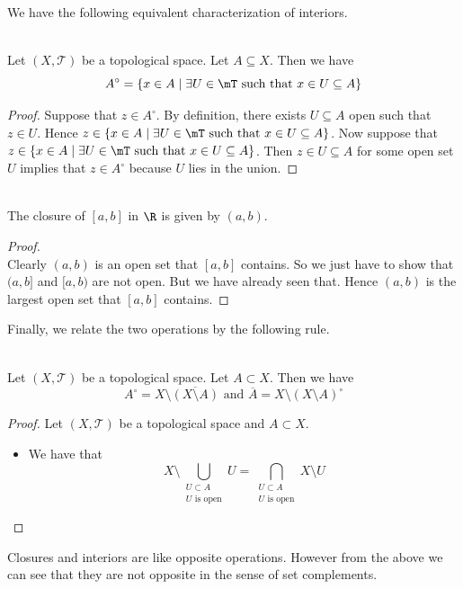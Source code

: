 \documentclass[a4paper]{article}
\begin{document}
We have the following equivalent characterization of interiors. 

\begin{prp}{}{}\\
Let $(X,\mathcal{T})$ be a topological space. Let $A\subseteq X$. Then we have $$A^\circ=\{x\in A\;|\;\exists U\in\mT\text{ such that }x\in U\subseteq A\}$$
\begin{proof}
Suppose that $z\in A^\circ$. By definition, there exists $U\subseteq A$ open such that $z\in U$. Hence $z\in\{x\in A\;|\;\exists U\in\mT\text{ such that }x\in U\subseteq A\}$. Now suppose that $z\in\{x\in A\;|\;\exists U\in\mT\text{ such that }x\in U\subseteq A\}$. Then $z\in U\subseteq A$ for some open set $U$ implies that $z\in A^\circ$ because $U$ lies in the union. 
\end{proof}
\end{prp}

\begin{eg}{}{}\\
The closure of $[a,b]$ in $\R$ is given by $(a,b)$. 
\begin{proof}\\
Clearly $(a,b)$ is an open set that $[a,b]$ contains. So we just have to show that $(a,b]$ and $[a,b)$ are not open. But we have already seen that. Hence $(a,b)$ is the largest open set that $[a,b]$ contains. 
\end{proof}
\end{eg}

Finally, we relate the two operations by the following rule. 

\begin{prp}{}{}\\
Let $(X,\mathcal{T})$ be a topological space. Let $A\subset X$. Then we have $$A^\circ=X\setminus\overline{(X\setminus A)}\text{ and }\overline{A}=X\setminus(X\setminus A)^\circ$$ 
\begin{proof}
Let $(X,\mathcal{T})$ be a topological space and $A\subset X$. 
\begin{itemize}
\item We have that $$X\setminus\bigcup_{\substack{U\subset A\\U\text{ is open}}}U=\bigcap_{\substack{U\subset A\\U\text{ is open}}}X\setminus U$$
\end{itemize}
\end{proof}
\end{prp}

Closures and interiors are like opposite operations. However from the above we can see that they are not opposite in the sense of set complements. 
\end{document}
